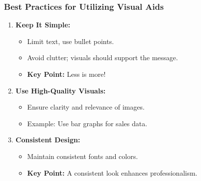 \documentclass[aspectratio=169]{beamer}
\begin{document}
\begin{frame}[fragile]
    \frametitle{Best Practices for Utilizing Visual Aids}

    \begin{enumerate}
        \item \textbf{Keep It Simple:}
            \begin{itemize}
                \item Limit text, use bullet points.
                \item Avoid clutter; visuals should support the message.
                \item \textbf{Key Point:} Less is more!
            \end{itemize}
        
        \item \textbf{Use High-Quality Visuals:}
            \begin{itemize}
                \item Ensure clarity and relevance of images.
                \item Example: Use bar graphs for sales data.
            \end{itemize}
        
        \item \textbf{Consistent Design:}
            \begin{itemize}
                \item Maintain consistent fonts and colors.
                \item \textbf{Key Point:} A consistent look enhances professionalism.
            \end{itemize}
    \end{enumerate}
\end{frame}
\end{document}
